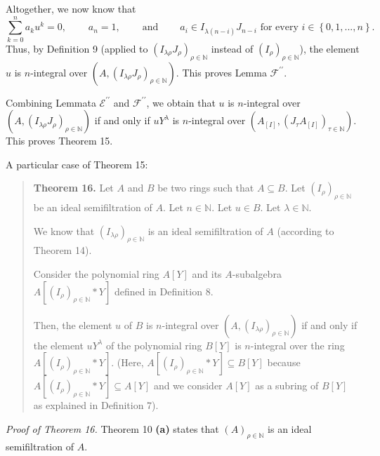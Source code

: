 \documentclass[12pt,final,notitlepage,onecolumn]{article}%
\begin{document}
Altogether, we now know that%
\[
\sum\limits_{k=0}^{n}a_{k}u^{k}=0,\ \ \ \ \ \ \ \ \ \ a_{n}%
=1,\ \ \ \ \ \ \ \ \ \ \text{and}\ \ \ \ \ \ \ \ \ \ a_{i}\in I_{\lambda
\left(  n-i\right)  }J_{n-i}\text{ for every }i\in\left\{  0,1,...,n\right\}
.
\]
Thus, by Definition 9 (applied to $\left(  I_{\lambda\rho}J_{\rho}\right)
_{\rho\in\mathbb{N}}$ instead of $\left(  I_{\rho}\right)  _{\rho\in
\mathbb{N}}$), the element $u$ is $n$-integral over $\left(  A,\left(
I_{\lambda\rho}J_{\rho}\right)  _{\rho\in\mathbb{N}}\right)  $. This proves
Lemma $\mathcal{F}^{\prime\prime}$.

Combining Lemmata $\mathcal{E}^{\prime\prime}$ and $\mathcal{F}^{\prime\prime
}$, we obtain that $u$ is $n$-integral over $\left(  A,\left(  I_{\lambda\rho
}J_{\rho}\right)  _{\rho\in\mathbb{N}}\right)  $ if and only if $uY^{\lambda}$
is $n$-integral over $\left(  A_{\left[  I\right]  },\left(  J_{\tau
}A_{\left[  I\right]  }\right)  _{\tau\in\mathbb{N}}\right)  $. This proves
Theorem 15.

A particular case of Theorem 15:

\begin{quote}
\textbf{Theorem 16.} Let $A$ and $B$ be two rings such that $A\subseteq B$.
Let $\left(  I_{\rho}\right)  _{\rho\in\mathbb{N}}$ be an ideal semifiltration
of $A$. Let $n\in\mathbb{N}$. Let $u\in B$. Let $\lambda\in\mathbb{N}$.

We know that $\left(  I_{\lambda\rho}\right)  _{\rho\in\mathbb{N}}$ is an
ideal semifiltration of $A$ (according to Theorem 14).

Consider the polynomial ring $A\left[  Y\right]  $ and its $A$-subalgebra
$A\left[  \left(  I_{\rho}\right)  _{\rho\in\mathbb{N}}\ast Y\right]  $
defined in Definition 8.

Then, the element $u$ of $B$ is $n$-integral over $\left(  A,\left(
I_{\lambda\rho}\right)  _{\rho\in\mathbb{N}}\right)  $ if and only if the
element $uY^{\lambda}$ of the polynomial ring $B\left[  Y\right]  $ is
$n$-integral over the ring $A\left[  \left(  I_{\rho}\right)  _{\rho
\in\mathbb{N}}\ast Y\right]  .$ (Here, $A\left[  \left(  I_{\rho}\right)
_{\rho\in\mathbb{N}}\ast Y\right]  \subseteq B\left[  Y\right]  $ because
$A\left[  \left(  I_{\rho}\right)  _{\rho\in\mathbb{N}}\ast Y\right]
\subseteq A\left[  Y\right]  $ and we consider $A\left[  Y\right]  $ as a
subring of $B\left[  Y\right]  $ as explained in Definition 7).
\end{quote}

\textit{Proof of Theorem 16.} Theorem 10 \textbf{(a)} states that $\left(
A\right)  _{\rho\in\mathbb{N}}$ is an ideal semifiltration of $A$.
\end{document}
